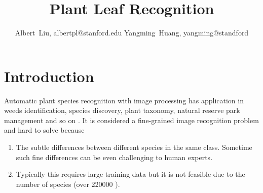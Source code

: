 \documentclass[journal, 10pt]{IEEEtran}
\begin{document}
%
\title{Plant Leaf Recognition}
%
%
%
\author{Albert~Liu, albertpl@stanford.edu
        Yangming~Huang, yangming@standford}%

%
%

\setcounter{secnumdepth}{2} %
\setcounter{tocdepth}{3}    %


\maketitle

\section{Introduction}
Automatic plant species recognition with image processing has application in weeds identification, species discovery, plant taxonomy, natural reserve park management and so on \cite{Pedro13}.  It is considered a fine-grained image recognition problem and hard to solve because
\begin{enumerate}
  \item The subtle differences between different species in the same class. Sometime such fine differences can be even challenging to human experts.
  \item Typically this requires large training data but it is not feasible due to the number of species (over 220000 \cite{Charles13}).
\end{enumerate}
\end{document}
